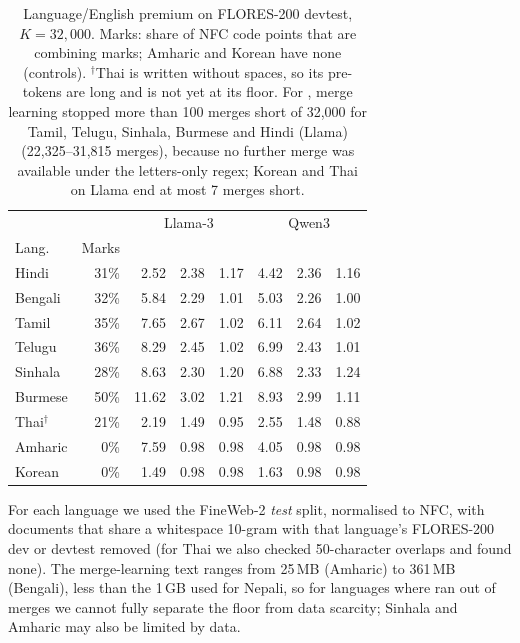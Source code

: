 \begin{table}[!htb]
\centering
\small
\setlength{\tabcolsep}{3pt}
\begin{tabular}{lr|rrr|rrr}
\toprule
& & \multicolumn{3}{c|}{Llama-3} & \multicolumn{3}{c}{Qwen3} \\
Lang. & Marks & \RO{} & \RI{} & \RII{} & \RO{} & \RI{} & \RII{} \\
\midrule
Hindi & 31\% & 2.52 & 2.38 & 1.17 & 4.42 & 2.36 & 1.16 \\
Bengali & 32\% & 5.84 & 2.29 & 1.01 & 5.03 & 2.26 & 1.00 \\
Tamil & 35\% & 7.65 & 2.67 & 1.02 & 6.11 & 2.64 & 1.02 \\
Telugu & 36\% & 8.29 & 2.45 & 1.02 & 6.99 & 2.43 & 1.01 \\
Sinhala & 28\% & 8.63 & 2.30 & 1.20 & 6.88 & 2.33 & 1.24 \\
Burmese & 50\% & 11.62 & 3.02 & 1.21 & 8.93 & 2.99 & 1.11 \\
Thai$^\dagger$ & 21\% & 2.19 & 1.49 & 0.95 & 2.55 & 1.48 & 0.88 \\
\midrule
Amharic & 0\% & 7.59 & 0.98 & 0.98 & 4.05 & 0.98 & 0.98 \\
Korean & 0\% & 1.49 & 0.98 & 0.98 & 1.63 & 0.98 & 0.98 \\
\bottomrule
\end{tabular}
\caption{Language/English premium on FLORES-200 devtest, $K{=}32{,}000$. Marks: share of NFC code points that are combining marks; Amharic and Korean have none (controls). $^\dagger$Thai is written without spaces, so its pre-tokens are long and \RI{} is not yet at its floor. For \RI{}, merge learning stopped more than 100 merges short of 32{,}000 for Tamil, Telugu, Sinhala, Burmese and Hindi (Llama) (22{,}325--31{,}815 merges), because no further merge was available under the letters-only regex; Korean and Thai on Llama end at most 7 merges short.}
\label{tab:xling}
\end{table}

For each language we used the FineWeb-2 \emph{test} split, normalised to NFC, with documents that share a whitespace 10-gram with that language's FLORES-200 dev or devtest removed (for Thai we also checked 50-character overlaps and found none). The merge-learning text ranges from 25\,MB (Amharic) to 361\,MB (Bengali), less than the 1\,GB used for Nepali, so for languages where \RI{} ran out of merges we cannot fully separate the floor from data scarcity; Sinhala and Amharic \RII{} may also be limited by data.

